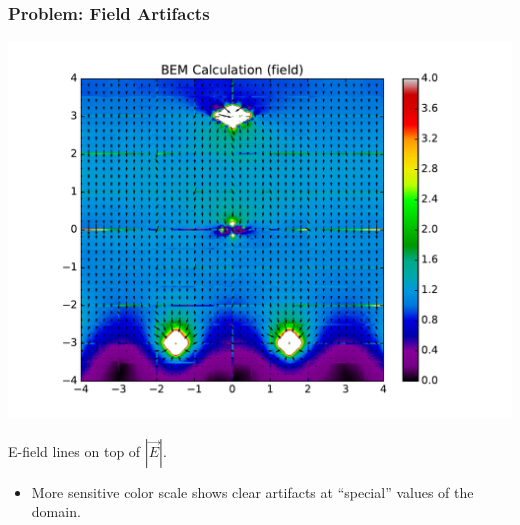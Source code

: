 \documentclass[xcolor=dvipsnames]{beamer}
\begin{document}
\begin{frame}
  \frametitle{Problem: Field Artifacts}
  \begin{center}
    \includegraphics[height=0.6\textheight]{uboone-drift-field-tight.pdf}
    
    \scriptsize E-field lines on top of $\left|\vec{E}\right|$.
  \end{center}
  
  \begin{itemize}
  \item More sensitive color scale shows clear artifacts at
    ``special'' values of the domain.
  \end{itemize}
\end{frame}
\end{document}
